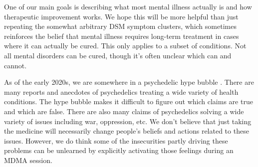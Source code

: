 \documentclass[12pt,letterpaper]{book}
\begin{document}
One of our main goals is describing what most mental illness actually is and how therapeutic improvement works. We hope this will be more helpful than just repeating the somewhat arbitrary DSM symptom clusters, which sometimes reinforces the belief that mental illness requires long-term treatment in cases where it can actually be cured. This only applies to a subset of conditions. Not all mental disorders can be cured, though it's often unclear which can and cannot.


As of the early 2020s, we are somewhere in a psychedelic hype bubble \cite{yaden2022preparing}. There are many reports and anecdotes of psychedelics treating a wide variety of health conditions. The hype bubble makes it difficult to figure out which claims are true and which are false. There are also many claims of psychedelics solving a wide variety of issues including war, oppression, etc. We don't believe that just taking the medicine will necessarily change people's beliefs and actions related to these issues. However, we do think some of the insecurities partly driving these problems can be unlearned by explicitly activating those feelings during an MDMA session.


\end{document}
